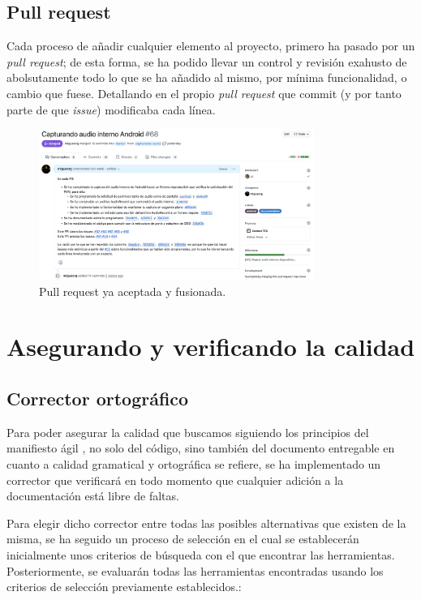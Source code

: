 \subsection{Pull request}

Cada proceso de añadir cualquier elemento al proyecto, primero ha pasado por un
\emph{pull request}; de esta forma, se ha podido llevar un control y revisión
exahusto de abolsutamente todo lo que se ha añadido al mismo, por mínima
funcionalidad, o cambio que fuese. Detallando en el propio \emph{pull request}
que commit (y por tanto parte de que \emph{issue}) modificaba cada línea.

\begin{figure}[H]
    \centering
    \includegraphics[width=0.8\textwidth]{fotos/pull_request.png}
    \caption{Pull request ya aceptada y fusionada.}
\end{figure}


\section{Asegurando y verificando la calidad}

\subsection{Corrector ortográfico}
Para poder asegurar la calidad que buscamos siguiendo los principios del manifiesto
ágil \cite{agile-manifiesto}, no solo del código, sino también del documento
entregable en cuanto a calidad gramatical y ortográfica se refiere, se ha
implementado un corrector que verificará en todo momento que cualquier adición a
la documentación está libre de faltas. 

Para elegir dicho corrector entre todas las posibles alternativas que existen de 
la misma, se ha seguido un proceso de selección en el cual se establecerán 
inicialmente unos criterios de búsqueda con el que encontrar las herramientas. 
Posteriormente, se evaluarán todas las herramientas encontradas usando los 
criterios de selección previamente establecidos.: 

